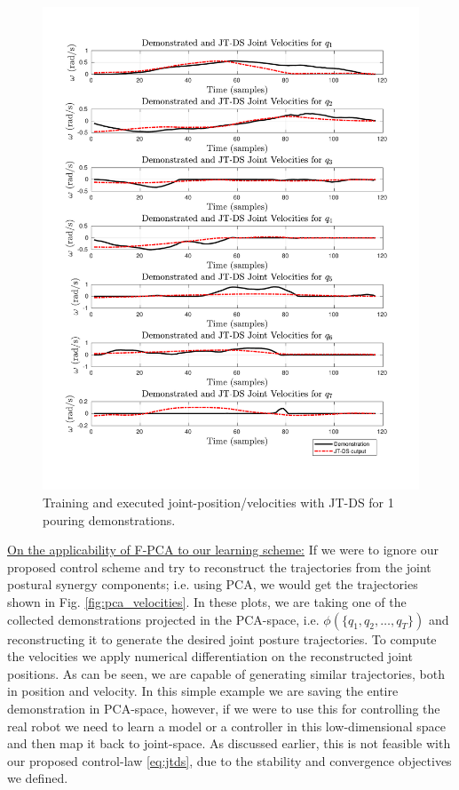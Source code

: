 \documentclass{article}
\begin{document}
\begin{enumerate}
\begin{figure}[!th]
\begin{minipage}{0.5\textwidth}
       	\includegraphics[trim={1.2cm 1.5cm 1.7cm 1.5cm},clip,width=\linewidth]{../../src/JTDS_mat_lib/figures/jtd_vel_pour1.pdf}
    \end{minipage}
   \caption{Training and executed joint-position/velocities with JT-DS for 1 pouring demonstrations. \label{fig:jtds_velocities}}
\end{figure}
\newpage
\noindent \underline{On the applicability of F-PCA to our learning scheme:}  If we were to ignore our proposed control scheme and try to reconstruct the trajectories from the joint postural synergy components; i.e. using PCA, we would get the trajectories shown in Fig. \ref{fig:pca_velocities}. In these plots, we are taking one of the collected demonstrations projected in the PCA-space, i.e. $\phi(\{q_1,q_2,\dots,q_T\})$ and reconstructing it to generate the desired joint posture trajectories. To compute the velocities we apply numerical differentiation on the reconstructed joint positions. As can be seen, we are capable of generating similar trajectories, both in position and velocity. In this simple example we are saving the entire demonstration in PCA-space, however, if we were to use this for controlling the real robot we need to learn a model or a controller in this low-dimensional space and then map it back to joint-space. As discussed earlier, this is not feasible with our proposed control-law \eqref{eq:jtds}, due to the stability and convergence objectives we defined. 


\end{enumerate}
\end{document}
